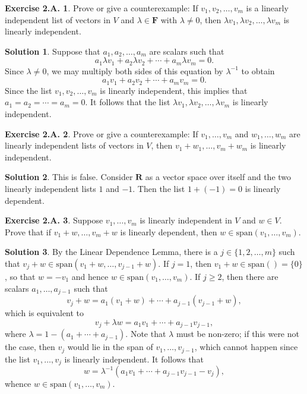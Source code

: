 \documentclass[12pt]{article}
\theoremstyle{definition}
\theoremstyle{exercise}
\newtheorem{exercise}{Exercise 2.A.}
\theoremstyle{solution}
\newtheorem*{solution}{Solution}
\newcommand{\Span}{\text{span}}
\newcommand{\R}{\mathbf{R}}
\newcommand{\F}{\mathbf{F}}
\begin{document}
\begin{exercise}
\label{ex:8}
    Prove or give a counterexample: If \( v_1, v_2, \ldots, v_m \) is a linearly independent list of vectors in \( V \) and \( \lambda \in \F \) with \( \lambda \neq 0 \), then \( \lambda v_1, \lambda v_2, \ldots, \lambda v_m \) is linearly independent.
\end{exercise}

\begin{solution}
    Suppose that \( a_1, a_2, \ldots, a_m \) are scalars such that
    \[
        a_1 \lambda v_1 + a_2 \lambda v_2 + \cdots + a_m \lambda v_m = 0.
    \]
    Since \( \lambda \neq 0 \), we may multiply both sides of this equation by \( \lambda^{-1} \) to obtain
    \[
        a_1 v_1 + a_2 v_2 + \cdots + a_m v_m = 0.
    \]
    Since the list \( v_1, v_2, \ldots, v_m \) is linearly independent, this implies that \( a_1 = a_2 = \cdots = a_m = 0 \). It follows that the list \( \lambda v_1, \lambda v_2, \ldots, \lambda v_m \) is linearly independent.
\end{solution}

\begin{exercise}
\label{ex:9}
    Prove or give a counterexample: If \( v_1, \ldots, v_m \) and \( w_1, \ldots, w_m \) are linearly independent lists of vectors in \( V \), then \( v_1 + w_1, \ldots, v_m + w_m \) is linearly independent.
\end{exercise}

\begin{solution}
    This is false. Consider \( \R \) as a vector space over itself and the two linearly independent lists \( 1 \) and \( -1 \). Then the list \( 1 + (-1) = 0 \) is linearly dependent.
\end{solution}

\begin{exercise}
\label{ex:10}
    Suppose \( v_1, \ldots, v_m \) is linearly independent in \( V \) and \( w \in V \). Prove that if \( v_1 + w, \ldots, v_m + w \) is linearly dependent, then \( w \in \Span (v_1, \ldots, v_m) \).
\end{exercise}

\begin{solution}
    By the Linear Dependence Lemma, there is a \( j \in \{ 1, 2, \ldots, m \} \) such that \( v_j + w \in \Span (v_1 + w, \ldots, v_{j-1} + w) \). If \( j = 1 \), then \( v_1 + w \in \Span () = \{ 0 \} \), so that \( w = -v_1 \) and hence \( w \in \Span (v_1, \ldots, v_m) \). If \( j \geq 2 \), then there are scalars \( a_1, \ldots, a_{j-1} \) such that
    \[
        v_j + w = a_1 (v_1 + w) + \cdots + a_{j-1} (v_{j-1} + w),
    \]
    which is equivalent to
    \[
        v_j + \lambda w = a_1 v_1 + \cdots + a_{j-1} v_{j-1},
    \]
    where \( \lambda = 1 - (a_1 + \cdots + a_{j-1}) \). Note that \( \lambda \) must be non-zero; if this were not the case, then \( v_j \) would lie in the span of \( v_1, \ldots, v_{j-1} \), which cannot happen since the list \( v_1, \ldots, v_j \) is linearly independent. It follows that
    \[
        w = \lambda^{-1} (a_1 v_1 + \cdots + a_{j-1} v_{j-1} - v_j),
    \]
    whence \( w \in \Span (v_1, \ldots, v_m) \).
\end{solution}
\end{document}

